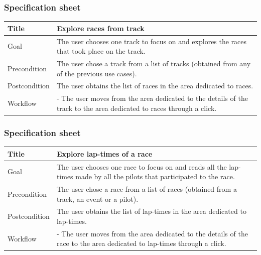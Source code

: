 \documentclass{beamer}
\begin{document}
\begin{frame}
    \frametitle{Specification sheet}
    \begin{table}
        \tiny
        \begin{tabular}{|p{2cm}|p{6cm}|}
        \hline
        Title & \textbf{Explore races from track} \\
        \hline
        Goal & The user chooses one track to focus on and explores the races that took place on the track. \\
        \hline
        Precondition & The user chose a track from a list of tracks (obtained from any of the previous use cases).\\
        \hline
        Postcondition & The user obtains the list of races in the area dedicated to races. \\
        \hline
        Workflow &
        - The user moves from the area dedicated to the details of the track to the
        area dedicated to races through a click. \\
        \hline
        \end{tabular}
\end{table}
\end{frame}

\begin{frame}
    \frametitle{Specification sheet}
    \begin{table}
        \tiny
        \begin{tabular}{|p{2cm}|p{6cm}|}
        \hline
        Title & \textbf{Explore lap-times of a race} \\
        \hline
        Goal & The user chooses one race to focus on and reads all the lap-times made by all the pilots 
        that participated to the race.\\
        \hline
        Precondition & The user chose a race from a list of races (obtained from a track, an event or a pilot).\\
        \hline
        Postcondition & The user obtains the list of lap-times in the area dedicated to lap-times. \\
        \hline
        Workflow &
        - The user moves from the area dedicated to the details of the race to the
        area dedicated to lap-times through a click. \\
        \hline
        \end{tabular}
\end{table}
\end{frame}
\end{document}
